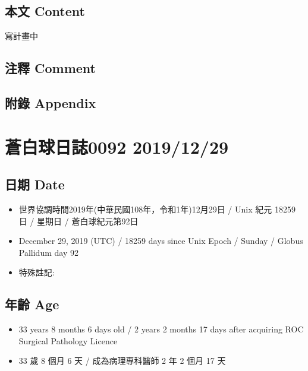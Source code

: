 \documentclass[a5paper, 12pt
]{book}
\providecommand{\tightlist}{%
  \setlength{\itemsep}{0pt}\setlength{\parskip}{0pt}}
\begin{document}
\hypertarget{ux672cux6587-content-27}{%
\subsection{本文 Content}\label{ux672cux6587-content-27}}

寫計畫中

\hypertarget{ux6ce8ux91cb-comment-26}{%
\subsection{注釋 Comment}\label{ux6ce8ux91cb-comment-26}}

\hypertarget{ux9644ux9304-appendix-27}{%
\subsection{附錄 Appendix}\label{ux9644ux9304-appendix-27}}

\hypertarget{ux84bcux767dux7403ux65e5ux8a8c0092-20191229}{%
\section{蒼白球日誌0092
2019/12/29}\label{ux84bcux767dux7403ux65e5ux8a8c0092-20191229}}

\hypertarget{ux65e5ux671f-date-28}{%
\subsection{日期 Date}\label{ux65e5ux671f-date-28}}

\begin{itemize}
\tightlist
\item
  世界協調時間2019年(中華民國108年，令和1年)12月29日 / Unix 紀元 18259
  日 / 星期日 / 蒼白球紀元第92日
\item
  December 29, 2019 (UTC) / 18259 days since Unix Epoch / Sunday /
  Globus Pallidum day 92
\item
  特殊註記:
\end{itemize}

\hypertarget{ux5e74ux9f61-age-28}{%
\subsection{年齡 Age}\label{ux5e74ux9f61-age-28}}

\begin{itemize}
\tightlist
\item
  33 years 8 months 6 days old / 2 years 2 months 17 days after
  acquiring ROC Surgical Pathology Licence
\item
  33 歲 8 個月 6 天 / 成為病理專科醫師 2 年 2 個月 17 天
\end{itemize}
\end{document}
